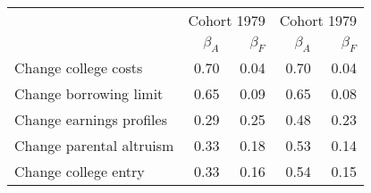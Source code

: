 \begin{tabular}{lrrrr}
\hline
   & \multicolumn{2}{|c|}{Cohort 1979} & \multicolumn{2}{|c|}{Cohort 1979} \\ 
 & $\beta_{A}$  & $\beta_{F}$  & $\beta_{A}$  & $\beta_{F}$  \\ 
\hline
Change college costs & 0.70  & 0.04  & 0.70  & 0.04  \\ 
Change borrowing limit & 0.65  & 0.09  & 0.65  & 0.08  \\ 
Change earnings profiles & 0.29  & 0.25  & 0.48  & 0.23  \\ 
Change parental altruism & 0.33  & 0.18  & 0.53  & 0.14  \\ 
Change college entry & 0.33  & 0.16  & 0.54  & 0.15  \\ 
\hline
\end{tabular}%
